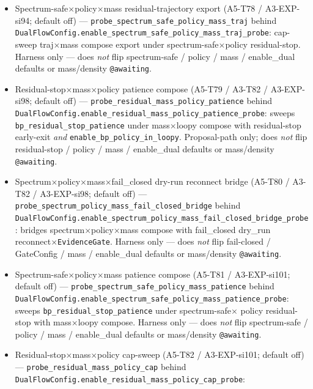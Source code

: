 \documentclass[11pt]{article}
\begin{document}
\begin{itemize}[leftmargin=1.5em]
  \emph{not} flip residual-stop / mass / enable\_dual defaults or
  mass/density \texttt{@awaiting}.
  \item Spectrum-safe$\times$policy$\times$mass residual-trajectory
  export (A5-T78 / A3-EXP-si94; default off) ---
  \texttt{probe\_spectrum\_safe\_policy\_mass\_traj} behind
  \texttt{DualFlowConfig.enable\_spectrum\_safe\_policy\_mass\_traj\_probe}:
  cap-sweep traj$\times$mass compose export under spectrum-safe$\times$policy
  residual-stop. Harness only --- does \emph{not} flip spectrum-safe /
  policy / mass / enable\_dual defaults or mass/density
  \texttt{@awaiting}.
  \item Residual-stop$\times$mass$\times$policy patience compose
  (A5-T79 / A3-T82 / A3-EXP-si98; default off) ---
  \texttt{probe\_residual\_mass\_policy\_patience} behind
  \texttt{DualFlowConfig.enable\_residual\_mass\_policy\_patience\_probe}:
  sweeps \texttt{bp\_residual\_stop\_patience} under mass$\times$loopy
  compose with residual-stop early-exit \emph{and}
  \texttt{enable\_bp\_policy\_in\_loopy}. Proposal-path only; does
  \emph{not} flip residual-stop / policy / mass / enable\_dual defaults
  or mass/density \texttt{@awaiting}.
  \item Spectrum$\times$policy$\times$mass$\times$fail\_closed dry-run
  reconnect bridge (A5-T80 / A3-T82 / A3-EXP-si98; default off) ---
  \texttt{probe\_spectrum\_policy\_mass\_fail\_closed\_bridge} behind
  \texttt{DualFlowConfig.enable\_spectrum\_policy\_mass\_fail\_closed\_bridge\_probe}:
  bridges spectrum$\times$policy$\times$mass compose with fail\_closed
  dry\_run reconnect$\times$\texttt{EvidenceGate}. Harness only --- does
  \emph{not} flip fail-closed / GateConfig / mass / enable\_dual
  defaults or mass/density \texttt{@awaiting}.
  \item Spectrum-safe$\times$policy$\times$mass patience compose
  (A5-T81 / A3-EXP-si101; default off) ---
  \texttt{probe\_spectrum\_safe\_policy\_mass\_patience} behind
  \texttt{DualFlowConfig.enable\_spectrum\_safe\_policy\_mass\_patience\_probe}:
  sweeps \texttt{bp\_residual\_stop\_patience} under spectrum-safe$\times$
  policy residual-stop with mass$\times$loopy compose. Harness only ---
  does \emph{not} flip spectrum-safe / policy / mass / enable\_dual
  defaults or mass/density \texttt{@awaiting}.
  \item Residual-stop$\times$mass$\times$policy cap-sweep
  (A5-T82 / A3-EXP-si101; default off) ---
  \texttt{probe\_residual\_mass\_policy\_cap} behind
  \texttt{DualFlowConfig.enable\_residual\_mass\_policy\_cap\_probe}:

\end{itemize}
\end{document}
